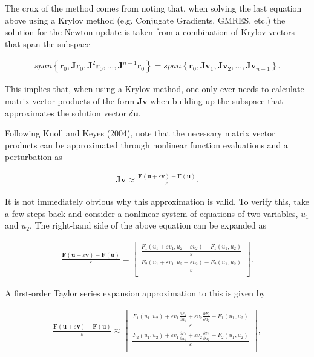 The crux of the method comes from noting that, when solving the last equation above using a Krylov method (e.g. Conjugate Gradients, GMRES, etc.) the solution for the Newton update is taken from a combination of Krylov vectors that span the subspace


\begin{align*}
span\left\{ \mathbf{r}_{0},\mathbf{Jr}_{0},\mathbf{J}^{2}\mathbf{r}_{0},...,\mathbf{J}^{n-1}\mathbf{r}_{0} \right\}=span\left\{ \mathbf{r}_{0},\mathbf{Jv}_{1},\mathbf{Jv}_{2},...,\mathbf{Jv}_{n-1} \right\}.
\end{align*}

This implies that, when using a Krylov method, one only ever needs to calculate matrix vector products of the form $\mathbf{Jv}$ when building up the subspace that approximates the solution vector $\delta \mathbf{u}$.

Following Knoll and Keyes (2004), note that the necessary matrix vector products can be approximated through nonlinear function evaluations and a perturbation as

\begin{align*}
\mathbf{Jv}\approx \frac{\mathbf{F}\left( \mathbf{u}+\varepsilon \mathbf{v} \right)-\mathbf{F}\left( \mathbf{u} \right)}{\varepsilon }.
\end{align*}

It is not immediately obvious why this approximation is valid. To verify this, take a few steps back and consider a nonlinear system of equations of two variables, $u_{1}$ and $u_{2}$. The right-hand side of the above equation can be expanded as

\begin{align*}
\frac{\mathbf{F}\left( \mathbf{u}+\varepsilon \mathbf{v} \right)-\mathbf{F}\left( \mathbf{u} \right)}{\varepsilon }=\left[ \begin{matrix}
   \frac{F_{1}\left( u_{1}+\varepsilon v_{1},u_{2}+\varepsilon v_{2} \right)-F_{1}(u_{1},u_{2})}{\varepsilon }  \\
   \frac{F_{2}\left( u_{1}+\varepsilon v_{1},u_{2}+\varepsilon v_{2} \right)-F_{2}(u_{1},u_{2})}{\varepsilon }  \\
\end{matrix} \right].
\end{align*}

A first-order Taylor series expansion approximation to this is given by

\begin{align*}
\frac{\mathbf{F}\left( \mathbf{u}+\varepsilon \mathbf{v} \right)-\mathbf{F}\left( \mathbf{u} \right)}{\varepsilon }\approx \left[ \begin{matrix}
   \frac{F_{1}\left( u_{1},u_{2} \right)+\varepsilon v_{1}\frac{\partial F_{1}}{\partial u_{1}}+\varepsilon v_{2}\frac{\partial F_{1}}{\partial u_{2}}-F_{1}(u_{1},u_{2})}{\varepsilon }  \\
   \frac{F_{2}\left( u_{1},u_{2} \right)+\varepsilon v_{1}\frac{\partial F_{2}}{\partial u_{1}}+\varepsilon v_{2}\frac{\partial F_{2}}{\partial u_{2}}-F_{2}(u_{1},u_{2})}{\varepsilon }  \\
\end{matrix} \right],
\end{align*}

